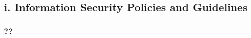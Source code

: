 \documentclass[a5paper,pagesize,10pt,bibtotoc,DIV=10,twoside]{scrbook}
\begin{document}
\subsection{\textbf{i.} Information Security Policies and Guidelines}



\subsubsection{?? }
\end{document}
